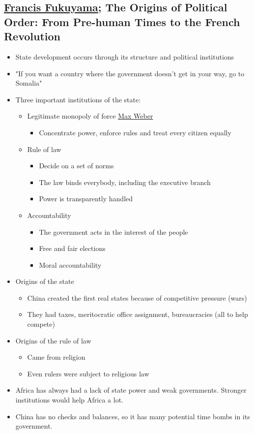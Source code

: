 \documentclass[11pt]{article}
\begin{document}
\subsection{\href{ Francis Fukuyama.org}{Francis Fukuyama}; The Origins of Political Order: From Pre-human Times to the French Revolution}
\label{sec:orgcb77455}
\begin{itemize}
\item State development occurs through its structure and political institutions
\item "If you want a country where the government doesn't get in your way, go to Somalia"
\item Three important institutions of the state:
\begin{itemize}
\item Legitimate monopoly of force \href{Max Weber.org}{Max Weber}
\begin{itemize}
\item Concentrate power, enforce rules and treat every citizen equally
\end{itemize}
\item Rule of law
\begin{itemize}
\item Decide on a set of norms
\item The law binds everybody, including the executive branch
\item Power is transparently handled
\end{itemize}
\item Accountability
\begin{itemize}
\item The government acts in the interest of the people
\item Free and fair elections
\item Moral accountability
\end{itemize}
\end{itemize}
\item Origins of the state
\begin{itemize}
\item China created the first real states because of competitive pressure (wars)
\item They had taxes, meritocratic office assignment, bureaucracies (all to help
compete)
\end{itemize}
\item Origins of the rule of law
\begin{itemize}
\item Came from religion
\item Even rulers were subject to religious law
\end{itemize}
\item Africa has always had a lack of state power and weak governments. Stronger
institutions would help Africa a lot.
\item China has no checks and balances, so it has many potential time bombs in its government.
\end{itemize}
\end{document}
